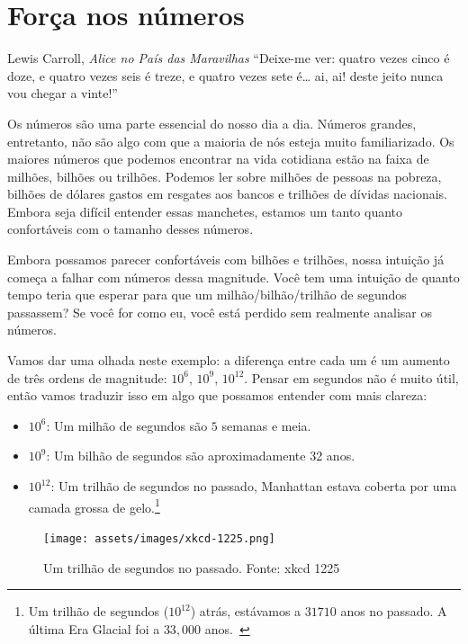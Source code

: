 \chapter{Força nos números}
\label{les:15}

\begin{chapquote}{Lewis Carroll, \textit{Alice no País das Maravilhas}}
\enquote{Deixe-me ver: quatro vezes cinco é doze, e quatro vezes seis é treze, e quatro vezes sete é… ai, ai! deste jeito nunca vou chegar a vinte!}
\end{chapquote}

Os números são uma parte essencial do nosso dia a dia. Números grandes, entretanto, não são algo com que a maioria de nós esteja muito familiarizado. Os maiores números que podemos encontrar na vida cotidiana estão na faixa de milhões, bilhões ou trilhões. Podemos ler sobre milhões de pessoas na pobreza, bilhões de dólares gastos em resgates aos bancos e trilhões de dívidas nacionais. Embora seja difícil entender essas manchetes, estamos um tanto quanto confortáveis com o tamanho desses números.

Embora possamos parecer confortáveis com bilhões e trilhões, nossa intuição já começa a falhar com números dessa magnitude. Você tem uma intuição de quanto tempo teria que esperar para que um milhão/bilhão/trilhão de segundos passassem? Se você for como eu, você está perdido sem realmente analisar os números.

Vamos dar uma olhada neste exemplo: a diferença entre cada um é um aumento de três ordens de magnitude: $10^6$, $10^9$, $10^{12}$. Pensar em segundos não é muito útil, então vamos traduzir isso em algo que possamos entender com mais clareza:

\begin{itemize}
  \item $10^6$: Um milhão de segundos são $5$ semanas e meia.
  \item $10^9$: Um bilhão de segundos são aproximadamente 32 anos.
  \item $10^{12}$: Um trilhão de segundos no passado, Manhattan estava coberta por uma camada grossa de gelo.\footnote{Um trilhão de segundos ($10^{12}$) atrás, estávamos a $31710$ anos no passado. A última Era Glacial foi a $33,000$ anos.~\cite{wiki:LGM}}
\end{itemize}

\begin{figure}
  \texttt{[image: assets/images/xkcd-1225.png]}
  \caption{Um trilhão de segundos no passado. Fonte: xkcd 1225}
  \label{fig:xkcd-1225}
\end{figure}

